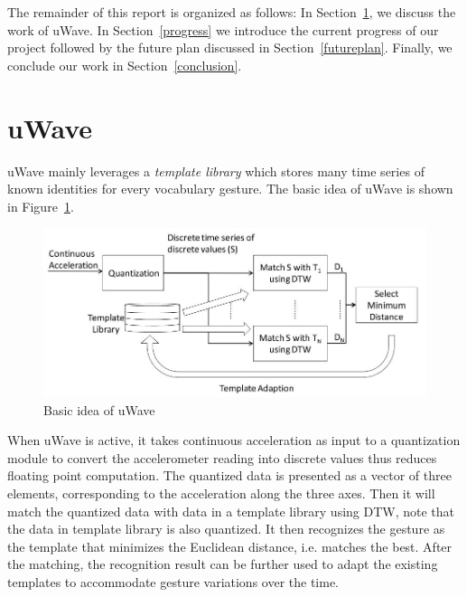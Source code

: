 \documentclass{acm_proc_article-sp}
\begin{document}
The remainder of this report is organized as follows: In Section~\ref{uWave}, we discuss the work of uWave. In Section~\ref{progress} we introduce the current progress of our project followed by the future plan discussed in Section~\ref{futureplan}. Finally, we conclude our work in Section~\ref{conclusion}.

\section{uWave}
\label{uWave}
uWave mainly leverages a \textit{template library} which stores many time series of known identities for every vocabulary gesture. The basic idea of uWave is shown in Figure~\ref{uWaveBasic}.
\begin{figure}
  \centering
  \includegraphics[width=0.8\linewidth]{uWave_basic.JPG}
  \caption{Basic idea of uWave}
  \label{uWaveBasic}
\end{figure}

When uWave is active, it takes continuous acceleration as input to a quantization module to convert the accelerometer reading into discrete values thus reduces floating point computation. The quantized data is presented as a vector of three elements, corresponding to the acceleration along the three axes. Then it will match the quantized data with data in a template library using DTW, note that the data in template library is also quantized. It then recognizes the gesture as the template that minimizes the Euclidean distance, i.e. matches the best. After the matching, the recognition result can be further used to adapt the existing templates to accommodate gesture variations over the time.
\end{document}
